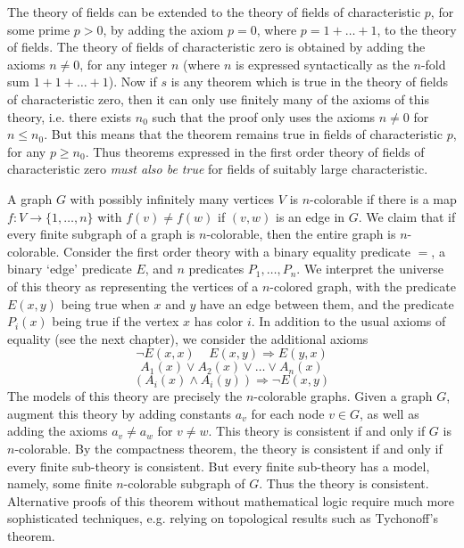 \begin{example}
    The theory of fields can be extended to the theory of fields of characteristic $p$, for some prime $p > 0$, by adding the axiom $p = 0$, where $p = 1 + \dots + 1$, to the theory of fields. The theory of fields of characteristic zero is obtained by adding the axioms $n \neq 0$, for any integer $n$ (where $n$ is expressed syntactically as the $n$-fold sum $1 + 1 + \dots + 1$). Now if $s$ is any theorem which is true in the theory of fields of characteristic zero, then it can only use finitely many of the axioms of this theory, i.e. there exists $n_0$ such that the proof only uses the axioms $n \neq 0$ for $n \leq n_0$. But this means that the theorem remains true in fields of characteristic $p$, for any $p \geq n_0$. Thus theorems expressed in the first order theory of fields of characteristic zero \emph{must also be true} for fields of suitably large characteristic.
\end{example}

\begin{example}
    A graph $G$ with possibly infinitely many vertices $V$ is $n$-colorable if there is a map $f: V \to \{ 1, \dots, n \}$ with $f(v) \neq f(w)$ if $(v,w)$ is an edge in $G$. We claim that if every finite subgraph of a graph is $n$-colorable, then the entire graph is $n$-colorable. Consider the first order theory with a binary equality predicate $=$, a binary `edge' predicate $E$, and $n$ predicates $P_1, \dots, P_n$. We interpret the universe of this theory as representing the vertices of a $n$-colored graph, with the predicate $E(x,y)$ being true when $x$ and $y$ have an edge between them, and the predicate $P_i(x)$ being true if the vertex $x$ has color $i$. In addition to the usual axioms of equality (see the next chapter), we consider the additional axioms
    \[ \neg E(x,x)\ \ \ \ \ E(x,y) \Rightarrow E(y,x) \]
    \[ A_1(x) \vee A_2(x) \vee \dots \vee A_n(x) \]
    \[ \left( A_i(x) \wedge A_i(y) \right) \Rightarrow \neg E(x,y) \]
    The models of this theory are precisely the $n$-colorable graphs. Given a graph $G$, augment this theory by adding constants $a_v$ for each node $v \in G$, as well as adding the axioms $a_v \neq a_w$ for $v \neq w$. This theory is consistent if and only if $G$ is $n$-colorable. By the compactness theorem, the theory is consistent if and only if every finite sub-theory is consistent. But every finite sub-theory has a model, namely, some finite $n$-colorable subgraph of $G$. Thus the theory is consistent. Alternative proofs of this theorem without mathematical logic require much more sophisticated techniques, e.g. relying on topological results such as Tychonoff's theorem.
\end{example}

